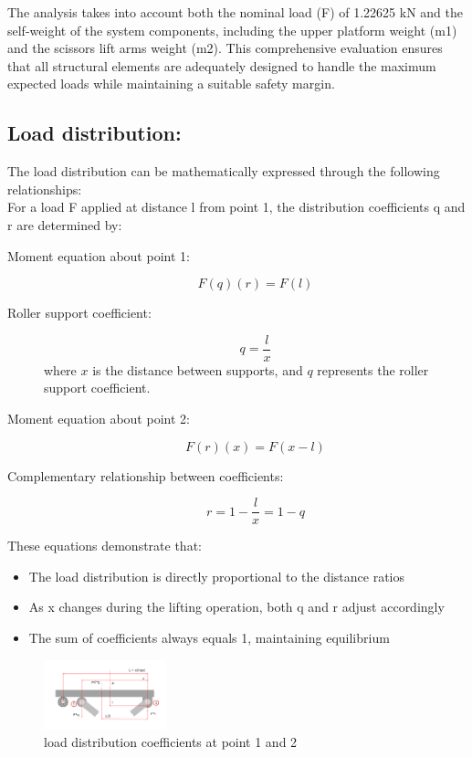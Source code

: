 \documentclass[../../main]{subfiles}
\begin{document}
The analysis takes into account both the nominal load (F) of 1.22625 kN
and the self-weight of the system components, including the upper
platform weight (m1) and the scissors lift arms weight (m2). This
comprehensive evaluation ensures that all structural elements are
adequately designed to handle the maximum expected loads while
maintaining a suitable safety margin.

\subsection{Load distribution:}
The load distribution can be mathematically expressed through the
following relationships:\\
For a load F applied at distance l from point 1, the distribution
coefficients q and r are determined by:
\begin{description}
  \item[Moment equation about point 1:]
    \begin{equation}
      F(q)(r) = F(l)
    \end{equation}
  
  \item[Roller support coefficient:]
    \begin{equation}
      q = \frac{l}{x}
    \end{equation}
    where $x$ is the distance between supports, and $q$ represents the roller support coefficient.
  
  \item[Moment equation about point 2:]
    \begin{equation}
      F(r)(x) = F(x-l)
    \end{equation}
  
  \item[Complementary relationship between coefficients:]
    \begin{equation}
      r = 1 - \frac{l}{x} = 1 - q
    \end{equation}
  \end{description}


These equations demonstrate that:
\begin{itemize}
\item
  The load distribution is directly proportional to the distance ratios
\item
  As x changes during the lifting operation, both q and r adjust
  accordingly
\item
  The sum of coefficients always equals 1, maintaining equilibrium
\end{itemize}
\begin{figure}[ht]
  \centering
  \includegraphics[width=0.3159\textwidth]{img/image015.png}
  \caption{load distribution coefficients at point 1 and
  2}
\end{figure}
\newpage
\end{document}
